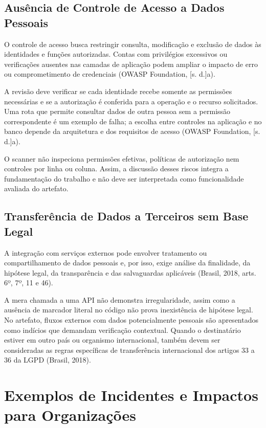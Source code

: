 \documentclass[12pt,a4paper,oneside]{report}
\begin{document}
\subsection{Ausência de Controle de Acesso a Dados Pessoais}

O controle de acesso busca restringir consulta, modificação e exclusão de dados às identidades e funções autorizadas. Contas com privilégios excessivos ou verificações ausentes nas camadas de aplicação podem ampliar o impacto de erro ou comprometimento de credenciais (OWASP Foundation, [s. d.]a).

A revisão deve verificar se cada identidade recebe somente as permissões necessárias e se a autorização é conferida para a operação e o recurso solicitados. Uma rota que permite consultar dados de outra pessoa sem a permissão correspondente é um exemplo de falha; a escolha entre controles na aplicação e no banco depende da arquitetura e dos requisitos de acesso (OWASP Foundation, [s. d.]a).

O scanner não inspeciona permissões efetivas, políticas de autorização nem controles por linha ou coluna. Assim, a discussão desses riscos integra a fundamentação do trabalho e não deve ser interpretada como funcionalidade avaliada do artefato.

\subsection{Transferência de Dados a Terceiros sem Base Legal}

A integração com serviços externos pode envolver tratamento ou compartilhamento de dados pessoais e, por isso, exige análise da finalidade, da hipótese legal, da transparência e das salvaguardas aplicáveis (Brasil, 2018, arts. 6º, 7º, 11 e 46).

A mera chamada a uma API não demonstra irregularidade, assim como a ausência de marcador literal no código não prova inexistência de hipótese legal. No artefato, fluxos externos com dados potencialmente pessoais são apresentados como indícios que demandam verificação contextual. Quando o destinatário estiver em outro país ou organismo internacional, também devem ser consideradas as regras específicas de transferência internacional dos artigos 33 a 36 da LGPD (Brasil, 2018).

\section{Exemplos de Incidentes e Impactos para Organizações}
\end{document}
